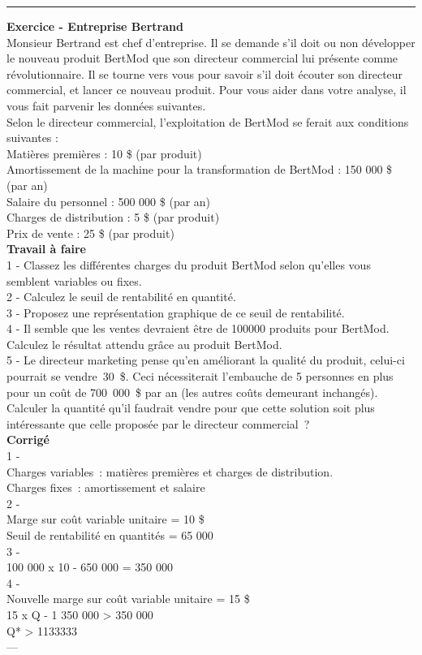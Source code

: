 \documentclass{kaobook}
\begin{document}
\noindent\rule{\textwidth}{0.5pt}
\textbf{Exercice - Entreprise Bertrand}\\
Monsieur Bertrand est chef d'entreprise. Il se demande s'il doit ou non développer le nouveau produit BertMod que son directeur commercial lui présente comme révolutionnaire. Il se tourne vers vous pour savoir s'il doit écouter son directeur commercial, et lancer ce nouveau produit. Pour vous aider dans votre analyse, il vous fait parvenir les données suivantes.\\
Selon le directeur commercial, l'exploitation de BertMod se ferait aux conditions suivantes :\\
Matières premières : 10 \$ (par produit)\\
Amortissement de la machine pour la transformation de BertMod : 150 000 \$ (par an)\\
Salaire du personnel : 500 000 \$ (par an)\\
Charges de distribution : 5 \$ (par produit)\\
Prix de vente : 25 \$ (par produit)\\

\textbf{Travail à faire}\\
1 - Classez les différentes charges du produit BertMod selon qu'elles vous semblent variables ou fixes.\\
2 - Calculez le seuil de rentabilité en quantité.\\
3 - Proposez une représentation graphique de ce seuil de rentabilité.\\
4 - Il semble que les ventes devraient être de 100000 produits pour BertMod. Calculez le résultat attendu grâce au produit BertMod.\\
5 - Le directeur marketing pense qu'en améliorant la qualité du produit, celui-ci pourrait se vendre 30 \$. Ceci nécessiterait l'embauche de 5 personnes en plus pour un coût de 700 000 \$ par an (les autres coûts demeurant inchangés). Calculer la quantité qu'il faudrait vendre pour que cette solution soit plus intéressante que celle proposée par le directeur commercial ?\\

\textbf{Corrigé}\\
1 -\\
Charges variables : matières premières et charges de distribution.\\
Charges fixes : amortissement et salaire\\
2 -\\
Marge sur coût variable unitaire = 10 \$\\
Seuil de rentabilité en quantités = 65 000\\
3 -\\
100 000 x 10 - 650 000 = 350 000\\
4 -\\
Nouvelle marge sur coût variable unitaire = 15 \$\\
15 x Q - 1 350 000 > 350 000\\
Q* > 1133333\\
---\\
\end{document}
